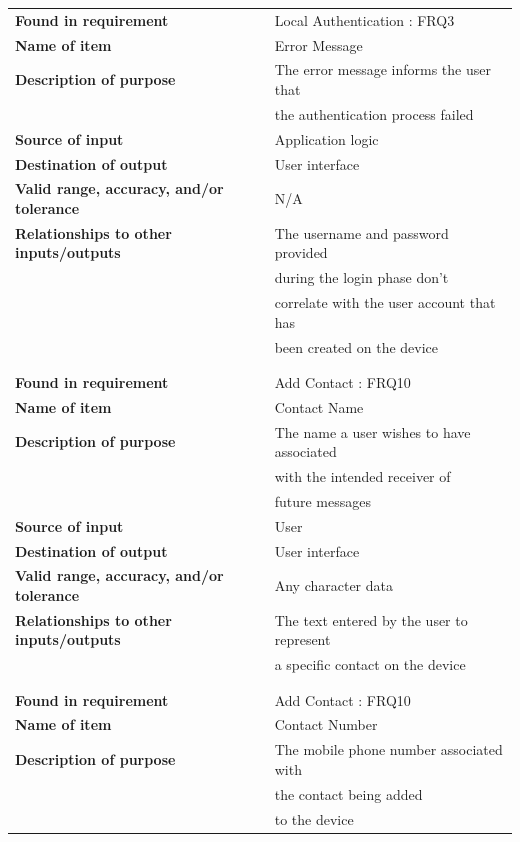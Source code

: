 \begin{tabular}{ll}

\textbf{Found in requirement}&Local Authentication : FRQ3\\
\textbf{Name of item}&Error Message\\
\textbf{Description of purpose}&The error message informs the user that\\& the authentication process failed\\
\textbf{Source of input}&Application logic\\
\textbf{Destination of output}&User interface\\
\textbf{Valid range, accuracy, and/or tolerance}&N/A\\
\textbf{Relationships to other inputs/outputs}&The username and password provided \\&during the login phase don't \\&correlate with the user account that has\\& been created on the device\\
&\\
&\\
\textbf{Found in requirement}&Add Contact : FRQ10\\
\textbf{Name of item}&Contact Name\\
\textbf{Description of purpose}&The name a user wishes to have associated \\&with the intended receiver of\\&future messages\\
\textbf{Source of input}&User\\
\textbf{Destination of output}&User interface\\
\textbf{Valid range, accuracy, and/or tolerance}&Any character data\\
\textbf{Relationships to other inputs/outputs}&The text entered by the user to represent\\& a specific contact on the device\\
&\\
&\\
\textbf{Found in requirement}&Add Contact : FRQ10\\
\textbf{Name of item}&Contact Number\\
\textbf{Description of purpose}&The mobile phone number associated with \\&the contact being added \\&to the device\\

\end{tabular}
